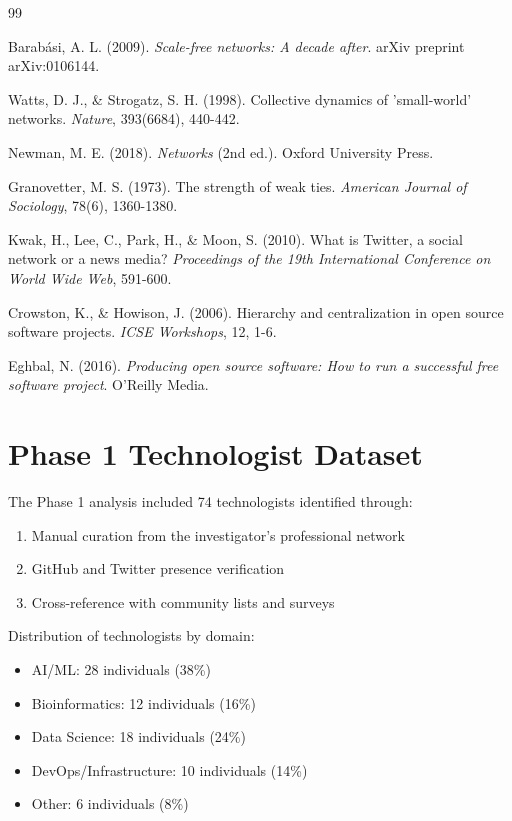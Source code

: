 \documentclass[11pt]{article}
\begin{document}
\begin{thebibliography}{99}

Barabási, A. L. (2009). \textit{Scale-free networks: A decade after}. arXiv preprint arXiv:0106144.

Watts, D. J., \& Strogatz, S. H. (1998). Collective dynamics of 'small-world' networks. \textit{Nature}, 393(6684), 440-442.

Newman, M. E. (2018). \textit{Networks} (2nd ed.). Oxford University Press.

Granovetter, M. S. (1973). The strength of weak ties. \textit{American Journal of Sociology}, 78(6), 1360-1380.

Kwak, H., Lee, C., Park, H., \& Moon, S. (2010). What is Twitter, a social network or a news media? \textit{Proceedings of the 19th International Conference on World Wide Web}, 591-600.

Crowston, K., \& Howison, J. (2006). Hierarchy and centralization in open source software projects. \textit{ICSE Workshops}, 12, 1-6.

Eghbal, N. (2016). \textit{Producing open source software: How to run a successful free software project}. O'Reilly Media.

\end{thebibliography}


\appendix

\section{Phase 1 Technologist Dataset}

The Phase 1 analysis included 74 technologists identified through:
\begin{enumerate}
    \item Manual curation from the investigator's professional network
    \item GitHub and Twitter presence verification
    \item Cross-reference with community lists and surveys
\end{enumerate}

Distribution of technologists by domain:
\begin{itemize}
    \item AI/ML: 28 individuals (38\%)
    \item Bioinformatics: 12 individuals (16\%)
    \item Data Science: 18 individuals (24\%)
    \item DevOps/Infrastructure: 10 individuals (14\%)
    \item Other: 6 individuals (8\%)
\end{itemize}
\end{document}
